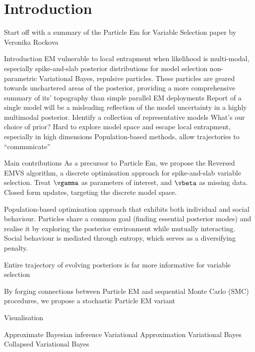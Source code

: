 \section{Introduction}

Start off with a summary of the Particle Em for Variable Selection paper by Veronika Rockova

Introduction
EM vulnerable to local entrapment when likelihood is multi-modal, especially spike-and-slab posterior
distributions for model selection
non-parametric Variational Bayes, repulsive particles. These particles are geared towards unchartered areas of
the posterior, providing a more comprehensive summary of its' topography than simple parallel EM deployments
Report of a single model will be a misleading reflection of the model uncertainty in a highly multimodal
posterior. Identify a collection of representative models
What's our choice of prior?
Hard to explore model space and escape local entrapment, especially in high dimensions
Population-based methods, allow trajectories to ``communicate''

Main contributions
As a precursor to Particle Em, we propose the Reversed EMVS algorithm, a discrete optimisation approach for
spike-and-slab variable selection. Treat $\vgamma$ as parameters of interest, and $\vbeta$ as missing data.
Closed form updates, targeting the discrete model space.

Population-based optimisation approach that exhibits both individual and social behaviour. Particles share a
common goal (finding essential posterior modes) and realise it by exploring the posterior environment while
mutually interacting. Social behaviour is mediated through entropy, which serves as a diversifying penalty.

Entire trajectory of evolving posteriors is far more informative for variable selection

By forging connections between Particle EM and sequential Monte Carlo (SMC) procedures, we propose a
stochastic Particle EM variant

Visualisation

Approximate Bayesian inference
Variational Approximation
Variational Bayes
Collapsed Variational Bayes
